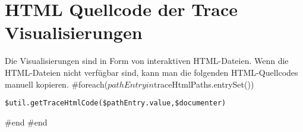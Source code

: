 \documentclass{latex_resources/autodoc}
\begin{document}
	\section{HTML Quellcode der Trace Visualisierungen}
Die Visualisierungen sind in Form von interaktiven HTML-Dateien. Wenn die HTML-Dateien nicht verfügbar sind, kann man die folgenden HTML-Quellcodes manuell kopieren.
	#foreach($pathEntry in $traceHtmlPaths.entrySet())
\begin{lstlisting}[label = lst:$pathEntry.key ,style = htmlAppendix, caption = $util.latexSafe($pathEntry.key) HTML Quellcode]
$util.getTraceHtmlCode($pathEntry.value,$documenter)
\end{lstlisting}
	#end
#end
\end{document}
